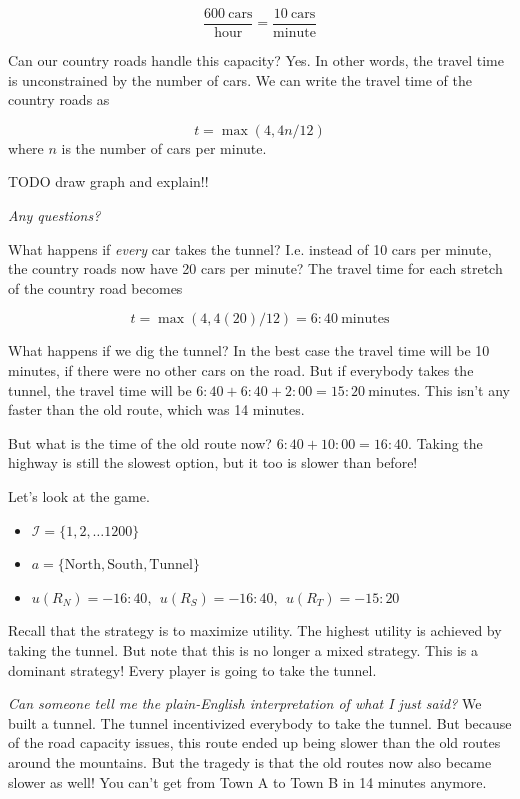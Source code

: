 \documentclass[11pt]{article}
\begin{document}
$$ \frac{600~\text{cars}}{\text{hour}} = \frac{10~\text{cars}}{\text{minute}}$$

Can our country roads handle this capacity? Yes. 
In other words, the travel time is unconstrained by the number of cars.
We can write the travel time of the country roads as

$$ t = \max(4, 4n/12)$$
where $n$ is the number of cars per minute.

TODO draw graph and explain!!

{\it Any questions?}

What happens if {\it every} car takes the tunnel? I.e. instead of 10 cars per minute, the country roads now have 20 cars per minute? The travel time for each stretch of the country road becomes

$$ t = \max(4, 4(20)/12) = 6{:}40~\text{minutes}$$ 

What happens if we dig the tunnel? In the best case the travel time will be 10 minutes, if there were no other cars on the road. But if everybody takes the tunnel, the travel time will be $6{:}40 + 6{:}40  + 2{:}00 = 15{:}20~\text{minutes}$. This isn't any faster than the old route, which was 14 minutes.

But what is the time of the old route now? $6{:}40 + 10{:}00 = 16{:}40$. Taking the highway is still the slowest option, but it too is slower than before!

Let's look at the game.

\begin{itemize}
    \item $\mathcal{I} = \{1,2,\ldots 1200\}$
    \item $a = \{\text{North},\text{South},\text{Tunnel}\}$
    \item $u(R_N) = -16{:}40,~~u(R_S) = -16{:}40,~~u(R_T) = -15{:}20$
\end{itemize}

Recall that the strategy is to maximize utility. The highest utility is achieved by taking the tunnel.
But note that this is no longer a mixed strategy. This is a dominant strategy! Every player is going to take the tunnel.

{\it Can someone tell me the plain-English interpretation of what I just said?} We built a tunnel. The tunnel incentivized everybody to take the tunnel. But because of the road capacity issues, this route ended up being slower than the old routes around the mountains. But the tragedy is that the old routes now also became slower as well! You can't get from Town A to Town B in 14 minutes anymore.  
\end{document}
